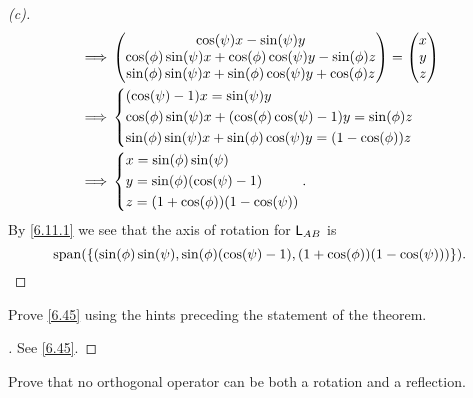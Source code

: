 \begin{proof}[(c)]
\begin{align*}
    \implies & \begin{pmatrix}
                 \cos(\psi) x - \sin(\psi) y                                      \\
                 \cos(\phi) \sin(\psi) x + \cos(\phi) \cos(\psi) y - \sin(\phi) z \\
                 \sin(\phi) \sin(\psi) x + \sin(\phi) \cos(\psi) y + \cos(\phi) z
               \end{pmatrix} = \begin{pmatrix}
                                 x \\
                                 y \\
                                 z
                               \end{pmatrix}       \\
    \implies & \begin{dcases}
                 (\cos(\psi) - 1) x = \sin(\psi) y                                      \\
                 \cos(\phi) \sin(\psi) x + (\cos(\phi) \cos(\psi) - 1) y = \sin(\phi) z \\
                 \sin(\phi) \sin(\psi) x + \sin(\phi) \cos(\psi) y = (1 - \cos(\phi)) z
               \end{dcases} \\
    \implies & \begin{dcases}
                 x = \sin(\phi) \sin(\psi)       \\
                 y = \sin(\phi) (\cos(\psi) - 1) \\
                 z = (1 + \cos(\phi)) (1 - \cos(\psi))
               \end{dcases}.
  \end{align*}
  By \cref{6.11.1} we see that the axis of rotation for \(\mathsf{L}_{AB}\) is
  \[
    \spn{\set{(\sin(\phi) \sin(\psi), \sin(\phi) (\cos(\psi) - 1), (1 + \cos(\phi)) (1 - \cos(\psi)))}}.
  \]
\end{proof}

\begin{ex}\label{ex:6.11.8}
  Prove \cref{6.45} using the hints preceding the statement of the theorem.
\end{ex}

\begin{proof}[]
  See \cref{6.45}.
\end{proof}

\begin{ex}\label{ex:6.11.9}
  Prove that no orthogonal operator can be both a rotation and a reflection.
\end{ex}

